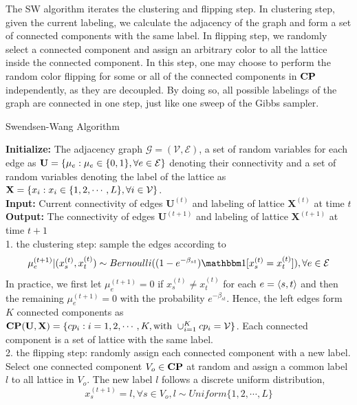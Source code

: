 \documentclass{article}
\begin{document}
The SW algorithm iterates the clustering and flipping step. In clustering step,
given the current labeling, we calculate the adjacency of the graph and form a set of connected components with the same label. In flipping step, we randomly select a connected component and assign an arbitrary color to all the lattice inside the connected component.
In this step, one may choose to perform the random color flipping for some or all of the connected components in $\mathbf{CP}$ independently, as they are decoupled. By doing so, all possible labelings of the graph are connected in one step, just like one sweep of the Gibbs sampler.


\begin{algorithm}[h]
\caption{Swendsen-Wang Algorithm}
\label{algo:sw}
    \textbf{Initialize:} The adjacency graph $\mathcal{G}=(\mathcal{V},\mathcal{E})$, a set of random variables for each edge as $\mathbf{U}=\{\mu_e:\mu_e\in\{0,1\} ,\forall e\in\mathcal{E}\}$ denoting their connectivity and a set of random variables denoting the label of the lattice as $\mathbf{X}=\{x_i:x_i\in\{1,2,\cdots,L\},\forall i\in\mathcal{V}\}$.\\
    \textbf{Input:} Current connectivity of edges  $\mathbf{U}^{(t)}$ and labeling of lattice $\mathbf{X}^{(t)}$ at time $t$\\
    \textbf{Output:} The connectivity of edges  $\mathbf{U}^{(t+1)}$ and labeling of lattice $\mathbf{X}^{(t+1)}$ at time $t+1$\\
    1. the clustering step: sample the edges according to
    \[\mu_e^{(t+1)}|(x_s^{(t)},x_t^{(t)})\sim Bernoulli((1-e^{-\beta_{st}})\indicator{x_s^{(t)}=x_t^{(t)}}),\forall e\in\edge\]
    In practice, we first let $\mu_e^{(t+1)}=0$ if $x_s^{(t)}\neq x_t^{(t)}$ for each $e=\langle s,t \rangle$ and then the remaining $\mu_e^{(t+1)}=0$ with the probability $e^{-\beta_{st}}$. Hence, the left edges form $K$ connected components as $\mathbf{CP}(\mathbf{U},\mathbf{X})=\{cp_i:i=1,2,\cdots,K, \text{with } \cup_{i=1}^Kcp_i=\mathcal{V}\}$. Each connected component is a set of lattice with the same label.\\
    2. the flipping step: randomly assign each connected component with a new label.\\
    Select one connected component $V_o\in\mathbf{CP}$ at random and assign a common label $l$ to all lattice in $V_o$. The new label $l$ follows a discrete uniform distribution,
    \[x_s^{(t+1)}=l,\forall s\in V_o,l\sim Uniform\{1,2,\cdots,L\}\]
\end{algorithm}
\end{document}
